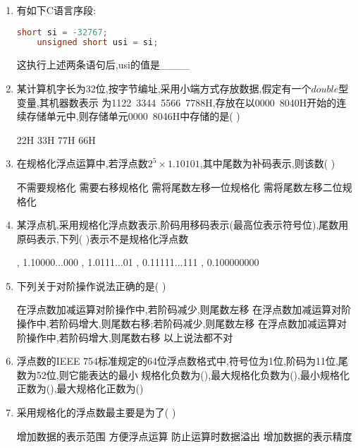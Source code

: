 \documentclass[12pt, a4paper, oneside, UTF8]{ctexbook}
\begin{document}
\begin{enumerate}
    \item \bt 有如下C语言序段:
    \begin{lstlisting}[language=C]
    short si = -32767;
    unsigned short usi = si;
    \end{lstlisting}
    这执行上述两条语句后,usi的值是\_\_\_\_ 

    \item 某计算机字长为32位,按字节编址,采用小端方式存放数据,假定有一个$double$型变量,其机器数表示
    为1122\ 3344\ 5566\ 7788H,存放在以0000\ 8040H开始的连续存储单元中,则存储单元0000\ 8046H中存储的是(   )
    \begin{choices}
        \task 22H 
        \task 33H 
        \task 77H 
        \task 66H 
    \end{choices}
    

    \item 在规格化浮点运算中,若浮点数$2^5\times1.10101$,其中尾数为补码表示,则该数(   ) 
    \begin{choices}[2]
        \task 不需要规格化
        \task 需要右移规格化
        \task 需将尾数左移一位规格化
        \task 需将尾数左移二位规格化
    \end{choices}


    \item 某浮点机,采用规格化浮点数表示,阶码用移码表示(最高位表示符号位),尾数用原码表示,下列(   )表示不是规格化浮点数 
    \begin{choices}[2]
        , 1.10000...000
        , 1.0111...01
        , 0.11111...111
        , 0.100000000 
    \end{choices}


    \item 下列关于对阶操作说法正确的是(   ) 
    \begin{choices}[1]
        \task 在浮点数加减运算对阶操作中,若阶码减少,则尾数左移
        \task 在浮点数加减运算对阶操作中,若阶码增大,则尾数右移;若阶码减少,则尾数左移
        \task 在浮点数加减运算对阶操作中,若阶码增大,则尾数右移
        \task 以上说法都不对
    \end{choices}


    \item 浮点数的IEEE 754标准规定的64位浮点数格式中,符号位为1位,阶码为11位,尾数为52位,则它能表达的最小
    规格化负数为(\qquad),最大规格化负数为(\qquad),最小规格化正数为(\qquad),最大规格化正数为(\qquad)

    \item 采用规格化的浮点数最主要是为了(   ) 
    \begin{choices}[2]
        \task 增加数据的表示范围
        \task 方便浮点运算
        \task 防止运算时数据溢出
        \task 增加数据的表示精度 
    \end{choices}



\end{enumerate}
\end{document}
